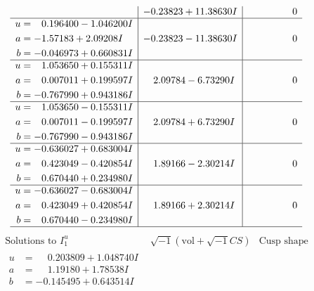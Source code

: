 \documentclass[1p]{elsarticle_modified}
\theoremstyle{definition}
\newcommand{\I}{\sqrt{-1}}
\begin{document}
$$\begin{array}{c|c|c}
 & -0.23823 + 11.38630 I & \phantom{-0.000000 } 0 \\ \hline\begin{aligned}
u &= \phantom{-}0.196400 - 1.046200 I \\
a &= -1.57183 + 2.09208 I \\
b &= -0.046973 + 0.660831 I\end{aligned}
 & -0.23823 - 11.38630 I & \phantom{-0.000000 } 0 \\ \hline\begin{aligned}
u &= \phantom{-}1.053650 + 0.155311 I \\
a &= \phantom{-}0.007011 + 0.199597 I \\
b &= -0.767990 + 0.943186 I\end{aligned}
 & \phantom{-}2.09784 - 6.73290 I & \phantom{-0.000000 } 0 \\ \hline\begin{aligned}
u &= \phantom{-}1.053650 - 0.155311 I \\
a &= \phantom{-}0.007011 - 0.199597 I \\
b &= -0.767990 - 0.943186 I\end{aligned}
 & \phantom{-}2.09784 + 6.73290 I & \phantom{-0.000000 } 0 \\ \hline\begin{aligned}
u &= -0.636027 + 0.683004 I \\
a &= \phantom{-}0.423049 - 0.420854 I \\
b &= \phantom{-}0.670440 + 0.234980 I\end{aligned}
 & \phantom{-}1.89166 - 2.30214 I & \phantom{-0.000000 } 0 \\ \hline\begin{aligned}
u &= -0.636027 - 0.683004 I \\
a &= \phantom{-}0.423049 + 0.420854 I \\
b &= \phantom{-}0.670440 - 0.234980 I\end{aligned}
 & \phantom{-}1.89166 + 2.30214 I & \phantom{-0.000000 } 0\\
 \hline 
 \end{array}$$\newpage$$\begin{array}{c|c|c}  
\text{Solutions to }I^u_{1}& \I (\text{vol} + \sqrt{-1}CS) & \text{Cusp shape}\\
 \hline 
\begin{aligned}
u &= \phantom{-}0.203809 + 1.048740 I \\
a &= \phantom{-}1.19180 + 1.78538 I \\
b &= -0.145495 + 0.643514 I\end{aligned}

\end{array}$$
\end{document}
